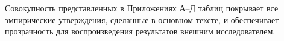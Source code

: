 \documentclass[a4paper, 12pt, oneside, openany]{article}
\begin{document}
Совокупность представленных в Приложениях А--Д таблиц покрывает все эмпирические утверждения, сделанные в основном тексте, и обеспечивает прозрачность для воспроизведения результатов внешним исследователем.

% 







\end{document}
